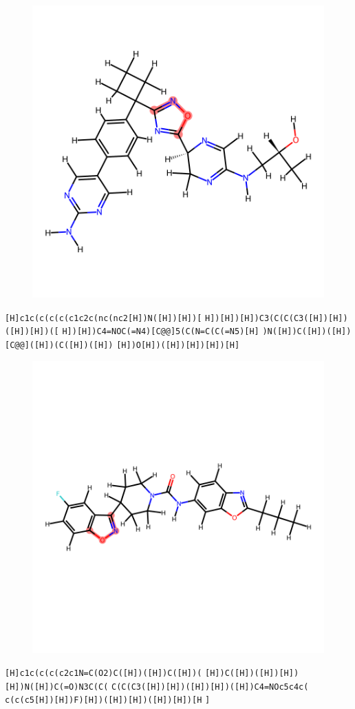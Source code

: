 \documentclass{article}
\begin{document}
\begin{figure}[ht]
\centering
    \includegraphics{mol218.png}
\end{figure}
\verb|[H]c1c(c(c(c(c1c2c(nc(nc2[H])N([H])[H])[| \verb|H])[H])[H])C3(C(C(C3([H])[H])([H])[H])([| \verb|H])[H])C4=NOC(=N4)[C@@]5(C(N=C(C(=N5)[H]| \verb|)N([H])C([H])([H])[C@@]([H])(C([H])([H])| \verb|[H])O[H])([H])[H])[H])[H]|

\begin{figure}[ht]
\centering
    \includegraphics{mol219.png}
\end{figure}
\verb|[H]c1c(c(c(c2c1N=C(O2)C([H])([H])C([H])(| \verb|[H])C([H])([H])[H])[H])N([H])C(=O)N3C(C(| \verb|C(C(C3([H])[H])([H])[H])([H])C4=NOc5c4c(| \verb|c(c(c5[H])[H])F)[H])([H])[H])([H])[H])[H| \verb|]|
\end{document}

